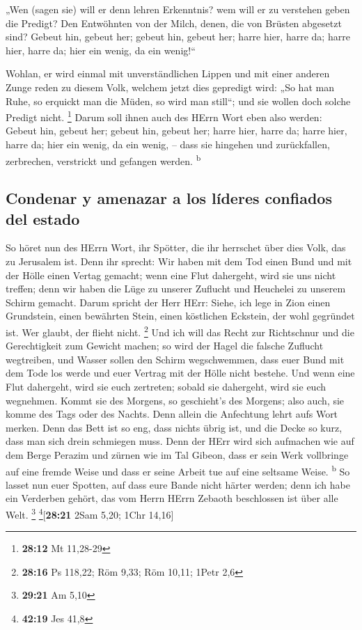  „Wen (sagen sie) will er denn lehren Erkenntnis? wem will
er zu verstehen geben die Predigt? Den Entwöhnten von der Milch, denen,
die von Brüsten abgesetzt sind?  Gebeut hin, gebeut her;
gebeut hin, gebeut her; harre hier, harre da; harre hier, harre da; hier
ein wenig, da ein wenig!{}``

 Wohlan, er wird einmal mit unverständlichen Lippen und
mit einer anderen Zunge reden zu diesem Volk, welchem jetzt dies
gepredigt wird:  „So hat man Ruhe, so erquickt man die
Müden, so wird man still``; und sie wollen doch solche Predigt nicht.
\footnote{\textbf{28:12} Mt 11,28-29}  Darum soll ihnen
auch des HErrn Wort eben also werden: Gebeut hin, gebeut her; gebeut
hin, gebeut her; harre hier, harre da; harre hier, harre da; hier ein
wenig, da ein wenig, -- dass sie hingehen und zurückfallen, zerbrechen,
verstrickt und gefangen werden. \textsuperscript{b}

\hypertarget{condenar-y-amenazar-a-los-luxedderes-confiados-del-estado}{%
\subsection{Condenar y amenazar a los líderes confiados del
estado}\label{condenar-y-amenazar-a-los-luxedderes-confiados-del-estado}}

 So höret nun des HErrn Wort, ihr Spötter, die ihr
herrschet über dies Volk, das zu Jerusalem ist.  Denn ihr
sprecht: Wir haben mit dem Tod einen Bund und mit der Hölle einen Vertag
gemacht; wenn eine Flut dahergeht, wird sie uns nicht treffen; denn wir
haben die Lüge zu unserer Zuflucht und Heuchelei zu unserem Schirm
gemacht.  Darum spricht der Herr HErr: Siehe, ich lege in
Zion einen Grundstein, einen bewährten Stein, einen köstlichen Eckstein,
der wohl gegründet ist. Wer glaubt, der flieht nicht. \footnote{\textbf{28:16}
  Ps 118,22; Röm 9,33; Röm 10,11; 1Petr 2,6}  Und ich
will das Recht zur Richtschnur und die Gerechtigkeit zum Gewicht machen;
so wird der Hagel die falsche Zuflucht wegtreiben, und Wasser sollen den
Schirm wegschwemmen,  dass euer Bund mit dem Tode los
werde und euer Vertrag mit der Hölle nicht bestehe. Und wenn eine Flut
dahergeht, wird sie euch zertreten; sobald sie dahergeht, wird sie euch
wegnehmen.  Kommt sie des Morgens, so geschieht's des
Morgens; also auch, sie komme des Tags oder des Nachts. Denn allein die
Anfechtung lehrt aufs Wort merken.  Denn das Bett ist so
eng, dass nichts übrig ist, und die Decke so kurz, dass man sich drein
schmiegen muss.  Denn der HErr wird sich aufmachen wie
auf dem Berge Perazim und zürnen wie im Tal Gibeon, dass er sein Werk
vollbringe auf eine fremde Weise und dass er seine Arbeit tue auf eine
seltsame Weise. \textsuperscript{b}  So lasset nun euer
Spotten, auf dass eure Bande nicht härter werden; denn ich habe ein
Verderben gehört, das vom Herrn HErrn Zebaoth beschlossen ist über alle
Welt. \footnote{\textbf{29:21} Am 5,10} \footnote{\textbf{42:19} Jes
  41,8}{[}\textbf{28:21} 2Sam 5,20; 1Chr 14,16{]}

